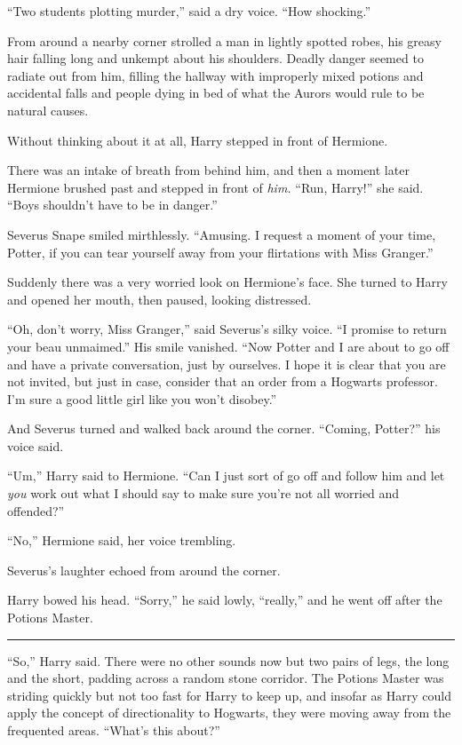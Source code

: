 ``Two students plotting murder,'' said a dry voice. ``How shocking.''

From around a nearby corner strolled a man in lightly spotted robes, his
greasy hair falling long and unkempt about his shoulders. Deadly danger
seemed to radiate out from him, filling the hallway with improperly
mixed potions and accidental falls and people dying in bed of what the
Aurors would rule to be natural causes.

Without thinking about it at all, Harry stepped in front of Hermione.

There was an intake of breath from behind him, and then a moment later
Hermione brushed past and stepped in front of \emph{him.} ``Run,
Harry!'' she said. ``Boys shouldn't have to be in danger.''

Severus Snape smiled mirthlessly. ``Amusing. I request a moment of your
time, Potter, if you can tear yourself away from your flirtations with
Miss Granger.''

Suddenly there was a very worried look on Hermione's face. She turned to
Harry and opened her mouth, then paused, looking distressed.

``Oh, don't worry, Miss Granger,'' said Severus's silky voice. ``I
promise to return your beau unmaimed.'' His smile vanished. ``Now Potter
and I are about to go off and have a private conversation, just by
ourselves. I hope it is clear that you are not invited, but just in
case, consider that an order from a Hogwarts professor. I'm sure a good
little girl like you won't disobey.''

And Severus turned and walked back around the corner. ``Coming,
Potter?'' his voice said.

``Um,'' Harry said to Hermione. ``Can I just sort of go off and follow
him and let \emph{you} work out what I should say to make sure you're
not all worried and offended?''

``No,'' Hermione said, her voice trembling.

Severus's laughter echoed from around the corner.

Harry bowed his head. ``Sorry,'' he said lowly, ``really,'' and he went
off after the Potions Master.

\begin{center}\rule{3in}{0.4pt}\end{center}

``So,'' Harry said. There were no other sounds now but two pairs of
legs, the long and the short, padding across a random stone corridor.
The Potions Master was striding quickly but not too fast for Harry to
keep up, and insofar as Harry could apply the concept of directionality
to Hogwarts, they were moving away from the frequented areas. ``What's
this about?''

